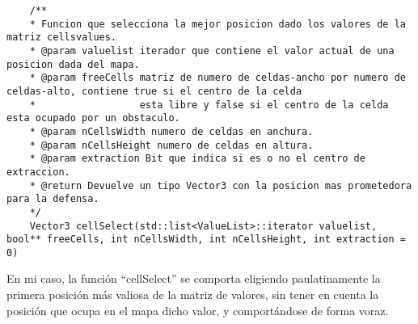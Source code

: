 \begin{lstlisting}
	/**
	* Funcion que selecciona la mejor posicion dado los valores de la matriz cellsvalues.
	* @param valuelist iterador que contiene el valor actual de una posicion dada del mapa.
	* @param freeCells matriz de numero de celdas-ancho por numero de celdas-alto, contiene true si el centro de la celda
	*                  esta libre y false si el centro de la celda esta ocupado por un obstaculo.
	* @param nCellsWidth numero de celdas en anchura.
	* @param nCellsHeight numero de celdas en altura.
	* @param extraction Bit que indica si es o no el centro de extraccion.
	* @return Devuelve un tipo Vector3 con la posicion mas prometedora para la defensa.
	*/
	Vector3 cellSelect(std::list<ValueList>::iterator valuelist, bool** freeCells, int nCellsWidth, int nCellsHeight, int extraction = 0)
\end{lstlisting}
En mi caso, la función ``cellSelect'' se comporta eligiendo paulatinamente la primera posición más valiosa de la matriz de valores, sin tener en cuenta la posición que ocupa en el mapa dicho valor, y comportándose de forma voraz.